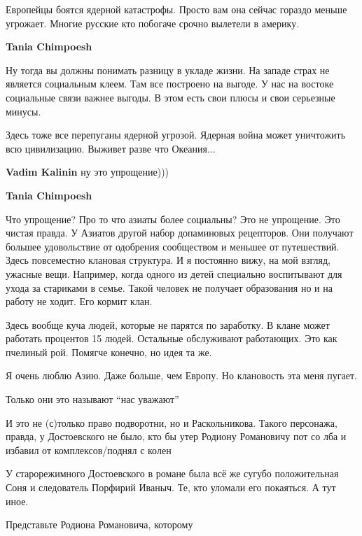 \begin{itemize}
\begin{itemize}

Европейцы боятся ядерной катастрофы. Просто вам она сейчас гораздо меньше
угрожает. Многие русские кто побогаче срочно вылетели в америку.

\textbf{Tania Chimpoesh} 

Ну тогда вы должны понимать разницу в укладе жизни. На западе страх не является
социальным клеем. Там все построено на выгоде. У нас на востоке социальные
связи важнее выгоды. В этом есть свои плюсы и свои серьезные минусы.

Здесь тоже все перепуганы ядерной угрозой. Ядерная война может уничтожить всю
цивилизацию. Выживет разве что Океания...

\textbf{Vadim Kalinin} ну это упрощение)))

\textbf{Tania Chimpoesh} 

Что упрощение? Про то что азиаты более социальны? Это не упрощение. Это чистая
правда. У Азиатов другой набор допаминовых рецепторов. Они получают большее
удовольствие от одобрения сообществом и меньшее от путешествий. Здесь
повсеместно клановая структура. И я постоянно вижу, на мой взгляд, ужасные
вещи. Например, когда одного из детей специально воспитывают для ухода за
стариками в семье. Такой человек не получает образования но и на работу не
ходит. Его кормит клан.

Здесь вообще куча людей, которые не парятся по заработку. В клане может
работать процентов 15 людей. Остальные обслуживают работающих. Это как пчелиный
рой. Помягче конечно, но идея та же.

Я очень люблю Азию. Даже больше, чем Европу. Но клановость эта меня пугает.

\end{itemize} %


Только они это называют \enquote{нас уважают}

И это не (с)только право подворотни, но и Раскольникова. Такого персонажа,
правда, у Достоевского не было, кто бы утер Родиону Романовичу пот со лба и
избавил от комплексов/поднял с колен


У старорежимного Достоевского в романе была всё же сугубо положительная Соня и
следователь Порфирий Иваныч. Те, кто уломали его покаяться. А тут иное.

Представьте Родиона Романовича, которому


\end{itemize}
